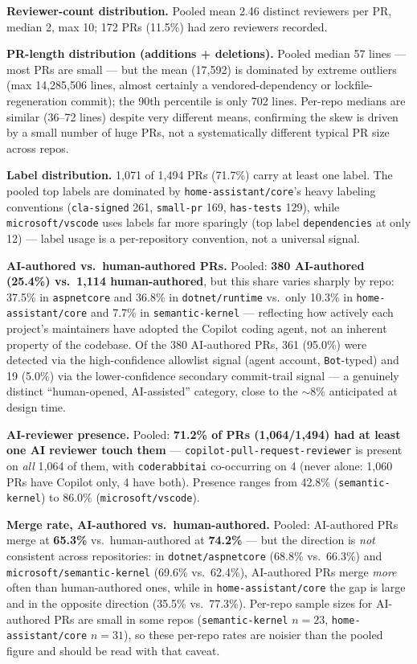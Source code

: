 \documentclass{experimentreport}
\begin{document}
{\textbf{Reviewer-count distribution.} Pooled mean 2.46 distinct reviewers per PR, median 2,
max 10; 172 PRs (11.5\%) had zero reviewers recorded.

\textbf{PR-length distribution (additions + deletions).} Pooled median 57 lines --- most PRs are
small --- but the mean (17{,}592) is dominated by extreme outliers (max 14{,}285{,}506 lines,
almost certainly a vendored-dependency or lockfile-regeneration commit); the 90th percentile is
only 702 lines. Per-repo medians are similar (36--72 lines) despite very different means, confirming
the skew is driven by a small number of huge PRs, not a systematically different typical PR size
across repos.

\textbf{Label distribution.} 1{,}071 of 1{,}494 PRs (71.7\%) carry at least one label. The pooled
top labels are dominated by \texttt{home-assistant/core}'s heavy labeling conventions
(\texttt{cla-signed} 261, \texttt{small-pr} 169, \texttt{has-tests} 129), while
\texttt{microsoft/vscode} uses labels far more sparingly (top label \texttt{dependencies} at only
12) --- label usage is a per-repository convention, not a universal signal.

\textbf{AI-authored vs.\ human-authored PRs.} Pooled: \textbf{380 AI-authored (25.4\%) vs.\ 1{,}114
human-authored}, but this share varies sharply by repo: 37.5\% in \texttt{aspnetcore} and 36.8\%
in \texttt{dotnet/runtime} vs.\ only 10.3\% in \texttt{home-assistant/core} and 7.7\% in
\texttt{semantic-kernel} --- reflecting how actively each project's maintainers have adopted the
Copilot coding agent, not an inherent property of the codebase. Of the 380 AI-authored PRs, 361
(95.0\%) were detected via the high-confidence allowlist signal (agent account, \texttt{Bot}-typed)
and 19 (5.0\%) via the lower-confidence secondary commit-trail signal --- a genuinely distinct
``human-opened, AI-assisted'' category, close to the $\sim$8\% anticipated at design time.

\textbf{AI-reviewer presence.} Pooled: \textbf{71.2\% of PRs (1{,}064/1{,}494) had at least one AI
reviewer touch them} --- \texttt{copilot-pull-request-reviewer} is present on \emph{all} 1{,}064 of
them, with \texttt{coderabbitai} co-occurring on 4 (never alone: 1{,}060 PRs have Copilot only, 4
have both). Presence ranges from 42.8\% (\texttt{semantic-kernel})
to 86.0\% (\texttt{microsoft/vscode}).

\textbf{Merge rate, AI-authored vs.\ human-authored.} Pooled: AI-authored PRs merge at
\textbf{65.3\%} vs.\ human-authored at \textbf{74.2\%} --- but the direction is \emph{not}
consistent across repositories: in \texttt{dotnet/aspnetcore} (68.8\% vs.\ 66.3\%) and
\texttt{microsoft/semantic-kernel} (69.6\% vs.\ 62.4\%), AI-authored PRs merge \emph{more} often
than human-authored ones, while in \texttt{home-assistant/core} the gap is large and in the
opposite direction (35.5\% vs.\ 77.3\%). Per-repo sample sizes for AI-authored PRs are small in
some repos (\texttt{semantic-kernel} $n=23$, \texttt{home-assistant/core} $n=31$), so these
per-repo rates are noisier than the pooled figure and should be read with that caveat.

}
\end{document}
